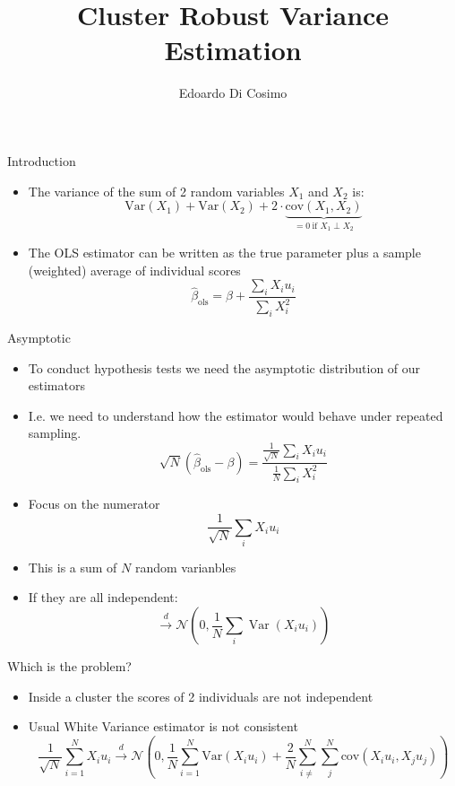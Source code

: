 \documentclass[
  ignorenonframetext,
]{beamer}
\title{Cluster Robust Variance Estimation}
\author{Edoardo Di Cosimo}
\date{}
\providecommand{\tightlist}{%
  \setlength{\itemsep}{0pt}\setlength{\parskip}{0pt}}
\begin{document}
\frame{\titlepage}


\begin{frame}{Introduction}
\label{introduction}
\begin{itemize}
\item
  The variance of the sum of 2 random variables \(X_{1}\) and \(X_{2}\)
  is: \[
  \text{Var}(X_{1})+\text{Var}(X_{2})+
  2\cdot
  \underbrace{\text{cov}(X_{1},X_{2})}_{=0\ \text{if } X_1 \perp X_2}
  \]
\item
  The OLS estimator can be written as the true parameter plus a sample
  (weighted) average of individual scores \[
  \hat{\beta}_\text{ols} = \beta + \frac{\sum_{i}X_{i}u_{i}}{\sum _{i}X_{i}^{2}}
  \]
\end{itemize}
\end{frame}

\begin{frame}{Asymptotic}
\label{asymptotic}
\begin{itemize}
\tightlist
\item
  To conduct hypothesis tests we need the asymptotic distribution of our
  estimators
\item
  I.e. we need to understand how the estimator would behave under
  repeated sampling. \[
  \sqrt{ N }\left( \hat{\beta}_\text{ols} - \beta \right) = \frac{\frac{1}{\sqrt{ N }}\sum_{i}X_{i}u_{i}}{\frac{1}{N}\sum _{i}X_{i}^{2}}
  \]
\end{itemize}
\end{frame}

\begin{frame}
\begin{itemize}
\tightlist
\item
  Focus on the numerator \[
  \frac{1}{\sqrt{ N }}\sum_{i}X_{i}u_{i}
  \]
\item
  This is a sum of \(N\) random varianbles
\item
  If they are all independent: \[
  \xrightarrow{d} \mathcal{N}\left( 0,  \frac{1}{N} \sum_{i}\operatorname{Var}(X_{i}u_{i}) \right)
  \]
\end{itemize}
\end{frame}

\begin{frame}{Which is the problem?}
\label{which-is-the-problem}
\begin{itemize}
\tightlist
\item
  Inside a cluster the scores of 2 individuals are not independent
\item
  Usual White Variance estimator is not consistent \[
  \frac{1}{\sqrt{ N }} \sum_{i=1}^N X_{i}u_{i} \xrightarrow{d} \mathcal{N}\left( 0, \frac{1}{N} \sum_{i=1}^N \text{Var}(X_{i}u_{i}) + \frac{2}{N}\sum_{i \ne}^N\sum_{j}^N \text{cov}(X_{i}u_{i},X_{j}u_{j})\right)
  \]
\end{itemize}
\end{frame}
\end{document}
